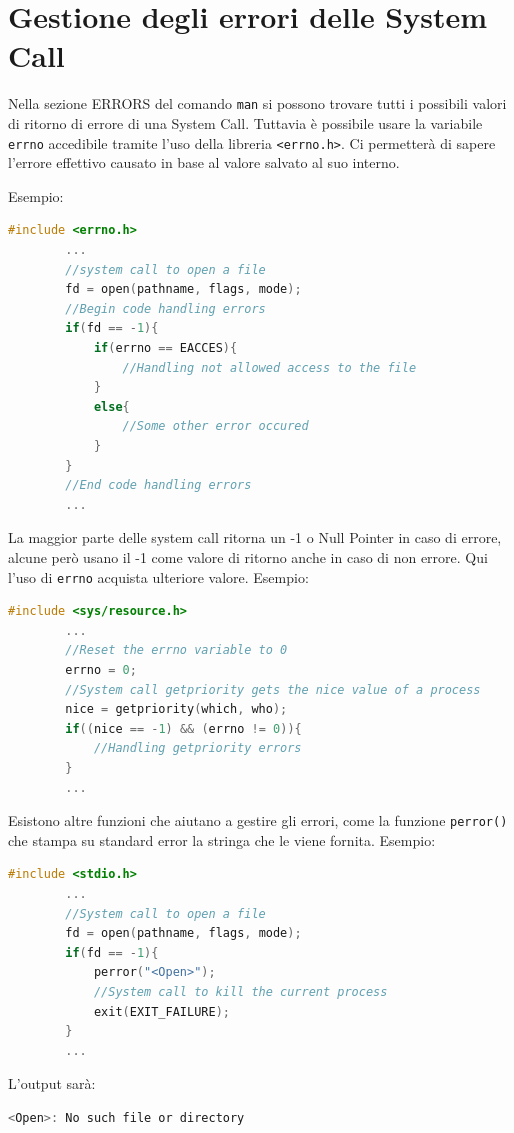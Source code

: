 \documentclass[a4paper, 12pt]{book}
\begin{document}
    \section{Gestione degli errori delle System Call}

    Nella sezione ERRORS del comando \verb|man| si possono trovare
    tutti i possibili valori di ritorno di errore di una 
    System Call. Tuttavia è possibile usare la variabile 
    \verb|errno| accedibile tramite l'uso della libreria
    \verb|<errno.h>|. Ci permetterà di sapere l'errore 
    effettivo causato in base al valore salvato al suo 
    interno.

    Esempio:
    \begin{lstlisting}[language=C]
        #include <errno.h>
        ...
        //system call to open a file
        fd = open(pathname, flags, mode);
        //Begin code handling errors
        if(fd == -1){
            if(errno == EACCES){
                //Handling not allowed access to the file
            }
            else{
                //Some other error occured
            }
        }
        //End code handling errors
        ...
    \end{lstlisting}
    La maggior parte delle system call ritorna un -1 
    o Null Pointer in caso di errore, alcune però 
    usano il -1 come valore di ritorno anche in caso di 
    non errore. Qui l'uso di \verb|errno| acquista 
    ulteriore valore. Esempio:
    \begin{lstlisting}[language=C]
        #include <sys/resource.h>
        ... 
        //Reset the errno variable to 0
        errno = 0;
        //System call getpriority gets the nice value of a process 
        nice = getpriority(which, who);
        if((nice == -1) && (errno != 0)){
            //Handling getpriority errors
        }
        ...        
    \end{lstlisting}
    
    Esistono altre funzioni che aiutano a gestire gli 
    errori, come la funzione \verb|perror()| che stampa 
    su standard error la stringa che le viene fornita.
    Esempio:
    \begin{lstlisting}[language=C]
        #include <stdio.h>
        ... 
        //System call to open a file
        fd = open(pathname, flags, mode);
        if(fd == -1){
            perror("<Open>");
            //System call to kill the current process
            exit(EXIT_FAILURE);
        }
        ...
    \end{lstlisting}
    L'output sarà:
    \begin{lstlisting}[language=C]
        <Open>: No such file or directory
    \end{lstlisting}
    
\end{document}
